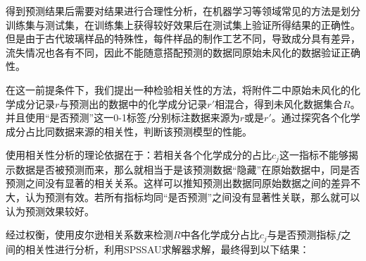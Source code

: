 \documentclass{my_paper}
\begin{document}
得到预测结果后需要对结果进行合理性分析，在机器学习等领域常见的方法是划分训练集与测试集，在训练集上获得较好效果后在测试集上验证所得结果的正确性。但是由于古代玻璃样品的特殊性，每件样品的制作工艺不同，导致成分具有差异，流失情况也各有不同，因此不能随意搭配预测的数据同原始未风化的数据验证正确性。

在这一前提条件下，我们提出一种检验相关性的方法，将附件二中原始未风化的化学成分记录$r$与预测出的数据中的化学成分记录$ r' $相混合，得到未风化数据集合$ R $。并且使用“是否预测”这一0-1标签$f$分别标注数据来源为$ r $或是$ r' $。通过探究各个化学成分占比同数据来源的相关性，判断该预测模型的性能。

使用相关性分析的理论依据在于：若相关各个化学成分的占比$c_j$这一指标不能够揭示数据是否被预测而来，那么就相当于是该预测数据“隐藏”在原始数据中，同是否预测之间没有显著的相关关系。这样可以推知预测出数据同原始数据之间的差异不大，认为预测有效。若所有指标均同“是否预测”之间没有显著性关联，那么就可以认为预测效果较好。

经过权衡，使用皮尔逊相关系数\cite{7}来检测$R$中各化学成分占比$ c_j $与是否预测指标$ f $之间的相关性进行分析，利用SPSSAU求解器\cite{5}求解，最终得到以下结果：
\end{document}
